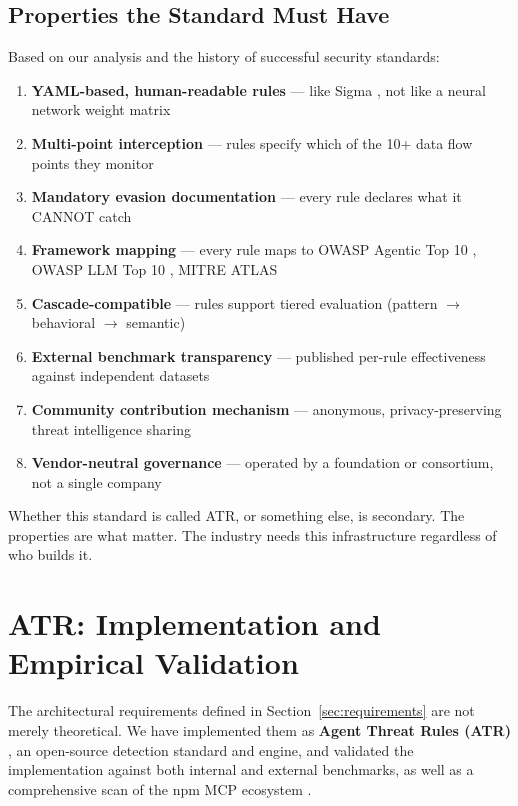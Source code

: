 \documentclass[11pt,letterpaper]{article}
\begin{document}
\subsection{Properties the Standard Must Have}

Based on our analysis and the history of successful security standards:

\begin{enumerate}
\item \textbf{YAML-based, human-readable rules} --- like Sigma \cite{sigma}, not like a neural network weight matrix
\item \textbf{Multi-point interception} --- rules specify which of the 10+ data flow points they monitor
\item \textbf{Mandatory evasion documentation} --- every rule declares what it CANNOT catch
\item \textbf{Framework mapping} --- every rule maps to OWASP Agentic Top 10 \cite{owaspagentic}, OWASP LLM Top 10 \cite{owaspllm}, MITRE ATLAS \cite{mitreatlas}
\item \textbf{Cascade-compatible} --- rules support tiered evaluation (pattern $\rightarrow$ behavioral $\rightarrow$ semantic)
\item \textbf{External benchmark transparency} --- published per-rule effectiveness against independent datasets \cite{pint}
\item \textbf{Community contribution mechanism} --- anonymous, privacy-preserving threat intelligence sharing
\item \textbf{Vendor-neutral governance} --- operated by a foundation or consortium, not a single company
\end{enumerate}

Whether this standard is called ATR, or something else, is secondary. The properties are what matter. The industry needs this infrastructure regardless of who builds it.


\section{ATR: Implementation and Empirical Validation}
\label{sec:atr}

The architectural requirements defined in Section~\ref{sec:requirements} are not merely theoretical. We have implemented them as \textbf{Agent Threat Rules (ATR)} \cite{atr}, an open-source detection standard and engine, and validated the implementation against both internal and external benchmarks, as well as a comprehensive scan of the npm MCP ecosystem \cite{atrscan}.
\end{document}

